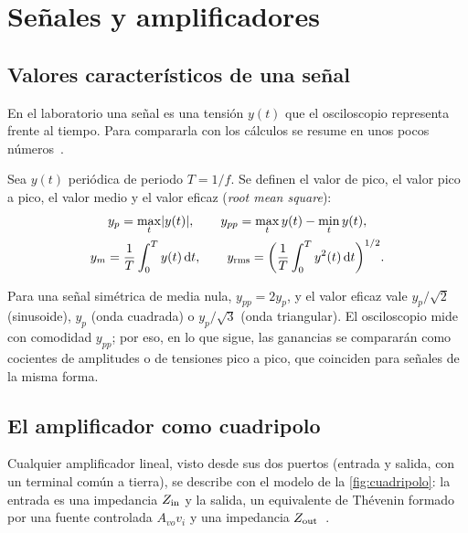 \section{Señales y amplificadores}\label{sec:amplificadores}
\subsection{Valores característicos de una señal}\label{sec:senales}
En el laboratorio una señal es una tensión $y(t)$ que el osciloscopio representa frente al tiempo.
Para compararla con los cálculos se resume en unos pocos números~\cite{TEORIA-EA}.

\begin{definicion}\label{def:valores}
Sea $y(t)$ periódica de periodo $T=1/f$. Se definen el valor de pico, el valor pico a pico, el
valor medio y el valor eficaz (\emph{root mean square}):
\begin{gather}
  y_{p}=\max_{t}\lvert y(t)\rvert,\qquad
  y_{pp}=\max_{t}y(t)-\min_{t}y(t),\label{eq:pico}\\
  y_{m}=\frac1T\int_{0}^{T}y(t)\,\mathrm{d} t,\qquad
  y_{\mathrm{rms}}=\biggl(\frac1T\int_{0}^{T}y^{2}(t)\,\mathrm{d} t\biggr)^{1/2}.\label{eq:rms}
\end{gather}
\end{definicion}

Para una señal simétrica de media nula, $y_{pp}=2y_{p}$, y el valor eficaz vale $y_p/\sqrt2$
(sinusoide), $y_p$ (onda cuadrada) o $y_p/\sqrt3$ (onda triangular). El osciloscopio mide con
comodidad $y_{pp}$; por eso, en lo que sigue, las ganancias se compararán como cocientes de
amplitudes o de tensiones pico a pico, que coinciden para señales de la misma forma.

\subsection{El amplificador como cuadripolo}\label{sec:cuadripolo}
Cualquier amplificador lineal, visto desde sus dos puertos (entrada y salida, con un terminal
común a tierra), se describe con el modelo de la \cref{fig:cuadripolo}: la entrada es una
impedancia $Z_{\mathrm{in}}$ y la salida, un equivalente de Thévenin formado por una fuente controlada
$A_{vo}v_i$ y una impedancia $Z_{\mathrm{out}}$~\cite{TEORIA-EA,TEORIA-ADICIONAL,SEDRA}.

